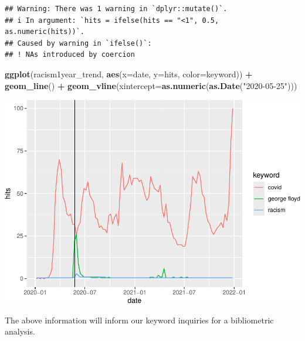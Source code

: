 \documentclass[
]{article}
\newenvironment{Shaded}{\begin{snugshade}}{\end{snugshade}}
\newcommand{\AttributeTok}[1]{\textcolor[rgb]{0.13,0.29,0.53}{#1}}
\newcommand{\FloatTok}[1]{\textcolor[rgb]{0.00,0.00,0.81}{#1}}
\newcommand{\FunctionTok}[1]{\textcolor[rgb]{0.13,0.29,0.53}{\textbf{#1}}}
\newcommand{\NormalTok}[1]{#1}
\newcommand{\OtherTok}[1]{\textcolor[rgb]{0.56,0.35,0.01}{#1}}
\newcommand{\SpecialCharTok}[1]{\textcolor[rgb]{0.81,0.36,0.00}{\textbf{#1}}}
\newcommand{\StringTok}[1]{\textcolor[rgb]{0.31,0.60,0.02}{#1}}
\begin{document}
\begin{Shaded}
\end{Shaded}

\begin{verbatim}
## Warning: There was 1 warning in `dplyr::mutate()`.
## i In argument: `hits = ifelse(hits == "<1", 0.5, as.numeric(hits))`.
## Caused by warning in `ifelse()`:
## ! NAs introduced by coercion
\end{verbatim}

\begin{Shaded}
\begin{Highlighting}[]
\FunctionTok{ggplot}\NormalTok{(racism1year\_trend, }\FunctionTok{aes}\NormalTok{(}\AttributeTok{x=}\NormalTok{date, }\AttributeTok{y=}\NormalTok{hits, }\AttributeTok{color=}\NormalTok{keyword)) }\SpecialCharTok{+}
  \FunctionTok{geom\_line}\NormalTok{() }\SpecialCharTok{+}
  \FunctionTok{geom\_vline}\NormalTok{(}\AttributeTok{xintercept=}\FunctionTok{as.numeric}\NormalTok{(}\FunctionTok{as.Date}\NormalTok{(}\StringTok{"2020{-}05{-}25"}\NormalTok{)))}
\end{Highlighting}
\end{Shaded}

\includegraphics{overview-keyword-racism_files/figure-latex/unnamed-chunk-9-1.pdf}

The above information will inform our keyword inquiries for a
bibliometric analysis.
\end{document}
